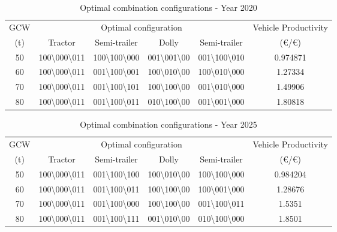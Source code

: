 \documentclass[ExampleMasters.tex]{subfiles}
\begin{document}
\begin{table}[ht]
\caption{Optimal combination configurations - Year 2020}
\centering
\begin{tabular}{c c c c c c}
\hline\hline
GCW & \multicolumn{4}{c}{Optimal configuration} & Vehicle Productivity \\ \cline{2-5}
(t) & Tractor & Semi-trailer & Dolly & Semi-trailer & (\euro/\euro)\\ 
\hline
50 & 100\textbackslash000\textbackslash011 &
	 100\textbackslash100\textbackslash000  & 001\textbackslash001\textbackslash00  & 
	 001\textbackslash100\textbackslash010 & 0.974871 \\
60 & 100\textbackslash000\textbackslash011 & 
	 001\textbackslash100\textbackslash001 & 100\textbackslash010\textbackslash00 &
	 100\textbackslash010\textbackslash000 & 1.27334 \\
70 & 100\textbackslash000\textbackslash011 &
	 001\textbackslash100\textbackslash101 & 100\textbackslash100\textbackslash00 &
	 001\textbackslash010\textbackslash000 & 1.49906 \\
80 & 100\textbackslash000\textbackslash011 & 
	 001\textbackslash100\textbackslash011 & 010\textbackslash100\textbackslash00 &
	 001\textbackslash001\textbackslash000 & 1.80818 \\
\hline
\end{tabular}
\label{table:optComb2020}
\end{table}

\begin{table}[ht]
\caption{Optimal combination configurations - Year 2025}
\centering
\begin{tabular}{c c c c c c}
\hline\hline
GCW & \multicolumn{4}{c}{Optimal configuration} & Vehicle Productivity \\ \cline{2-5}
(t) & Tractor & Semi-trailer & Dolly & Semi-trailer & (\euro/\euro)\\ 
\hline
50 & 100\textbackslash000\textbackslash011 & 001\textbackslash100\textbackslash100 & 100\textbackslash010\textbackslash00 & 100\textbackslash100\textbackslash000 & 0.984204 \\
60 & 100\textbackslash000\textbackslash011 & 001\textbackslash100\textbackslash011 & 100\textbackslash100\textbackslash00 & 100\textbackslash001\textbackslash000 & 1.28676 \\
70 & 100\textbackslash000\textbackslash011 & 001\textbackslash100\textbackslash000 & 100\textbackslash100\textbackslash00 & 001\textbackslash100\textbackslash011 & 1.5351 \\
80 & 100\textbackslash000\textbackslash011 & 001\textbackslash100\textbackslash111 & 001\textbackslash010\textbackslash00 & 010\textbackslash100\textbackslash000 & 1.8501 \\
\hline
\end{tabular}
\label{table:optComb2025}
\end{table}
\end{document}
